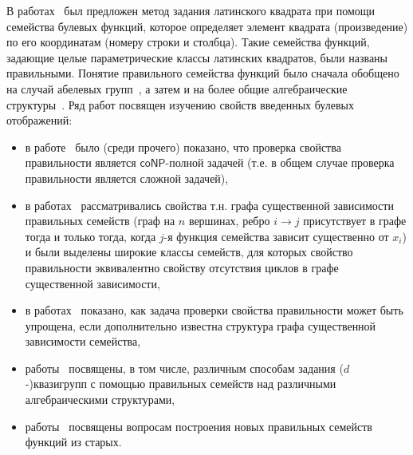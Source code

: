     В работах~\autocite{nosov98, nosov99} был предложен метод задания латинского квадрата при помощи семейства булевых функций, которое определяет элемент квадрата (произведение) по его координатам (номеру строки и столбца).
    Такие семейства функций, задающие целые параметрические классы латинских квадратов, были названы правильными.
    Понятие правильного семейства функций было сначала обобщено на случай абелевых групп~\autocite{nosov06, nosov06abel, nosov07, nosov08, kozlov08}, а затем и на более общие алгебраические структуры~\autocite{plaksina14, galatenko2020latin, galatenko23}.
    Ряд работ посвящен изучению свойств введенных булевых отображений:
    \begin{itemize}
        \item в работе~\autocite{nosov98} было (среди прочего) показано, что проверка свойства правильности является $\mathsf{coNP}$-полной задачей (т.е. в общем случае проверка правильности является сложной задачей),
        \item в работах~\autocite{nosov07, nosov08, kozlov08} рассматривались свойства т.н. графа существенной зависимости правильных семейств (граф на $n$ вершинах, ребро $ i \to j$ присутствует в графе тогда и только тогда, когда $j$-я функция семейства зависит существенно от $x_i$) и были выделены широкие классы семейств, для которых свойство правильности эквивалентно свойству отсутствия циклов в графе существенной зависимости,
        \item в работах~\autocite{rykov10, rykov14} показано, как задача проверки свойства правильности может быть упрощена, если дополнительно известна структура графа существенной зависимости семейства,
        \item работы~\autocite{plaksina14, galatenko2020latin, galatenko23} посвящены, в том числе, различным способам задания ($d$-)квазигрупп с помощью правильных семейств над различными алгебраическими структурами,
        \item работы~\autocite{galatenko21generation, galatenko2022generation} посвящены вопросам построения новых правильных семейств функций из старых.
    \end{itemize}

